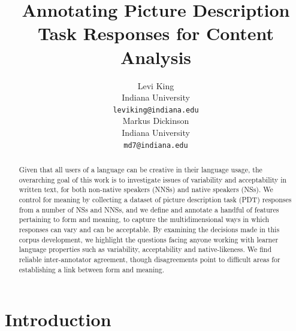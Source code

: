 \documentclass[11pt,a4paper]{article}
\title{Annotating Picture Description Task Responses for Content Analysis}
\author{Levi King \\
  Indiana University \\
  {\tt leviking@indiana.edu} \\\And
  Markus Dickinson \\
  Indiana University \\
  {\tt md7@indiana.edu} \\}
\date{}
\begin{document}
\maketitle
\begin{abstract}
Given that all users of a language can be creative in their language usage, the overarching goal of this work is to investigate issues of variability and acceptability in written text, for both non-native speakers (NNSs) and native speakers (NSs).  We control for meaning by collecting a dataset of picture description task (PDT) responses from a number of NSs and NNSs, and we define and annotate a handful of features pertaining to form and meaning, to capture the multidimensional ways in which responses can vary and can be acceptable.  By examining the decisions made in this corpus development, we highlight the questions facing anyone working with learner language properties such as variability, acceptability and native-likeness.  We find reliable inter-annotator agreement, though disagreements point to difficult areas for establishing a link between form and meaning.
\end{abstract}

\section{Introduction}



\end{document}
